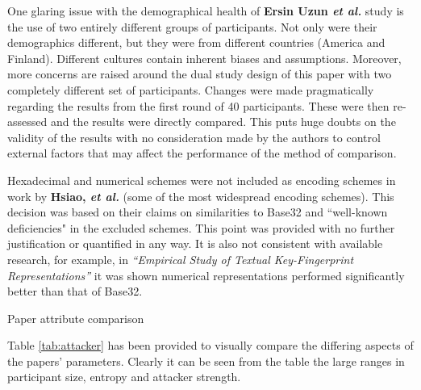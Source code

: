 One glaring issue with the demographical health of \textbf{Ersin Uzun \textit{et al.}}\cite{uzun2007usability} study is the use of two entirely different groups of participants. Not only were their demographics different, but they were from different countries (America and Finland). Different cultures contain inherent biases and assumptions. Moreover, more concerns are raised around the dual study design of this paper with two completely different set of participants. Changes were made pragmatically regarding the results from the first round of 40 participants. These were then re-assessed and the results were directly compared. This puts huge doubts on the validity of the results with no consideration made by the authors to control external factors that may affect the performance of the method of comparison.

Hexadecimal and numerical schemes were not included as encoding schemes in work by \textbf{Hsiao, \textit{et al.}}\cite{hsiao2009study} (some of the most widespread encoding schemes). This decision was based on their claims on similarities to Base32 and ``well-known deficiencies" in the excluded schemes. This point was provided with no further justification or quantified in any way. It is also not consistent with available research, for example, in \textit{``Empirical Study of Textual Key-Fingerprint Representations''}\cite{dechand2016empirical} it was shown numerical representations performed significantly better than that of Base32.

\begin{table}[h!]
    \makebox[\textwidth][c]{
        
    }%
    \caption{Paper attribute comparison}
    \label{tab:attacker}
\end{table}

Table \ref{tab:attacker} has been provided to visually compare the differing aspects of the papers' parameters. Clearly it can be seen from the table the large ranges in participant size, entropy and attacker strength.



